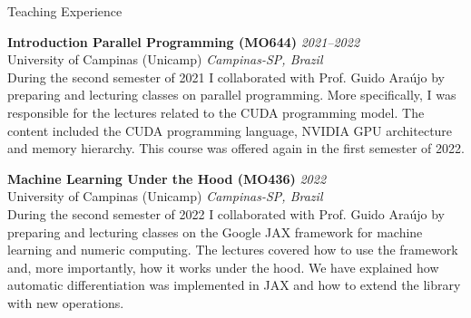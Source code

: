 \documentclass{resume}
\begin{document}
\begin{rSection}{Teaching Experience}

{\bf Introduction Parallel Programming (MO644)} \hfill {\em 2021--2022} \\
{\sc University of Campinas (Unicamp)} \hfill {\em Campinas-SP, Brazil} \\
During the second semester of 2021 I collaborated with Prof. Guido Araújo by
preparing and lecturing classes on parallel programming. More specifically, I
was responsible for the lectures related to the CUDA programming model. The
content included the CUDA programming language, NVIDIA GPU architecture and
memory hierarchy. This course was offered again in the first semester of 2022.

{\bf Machine Learning Under the Hood (MO436)} \hfill {\em 2022} \\
{\sc University of Campinas (Unicamp)} \hfill {\em Campinas-SP, Brazil} \\
During the second semester of 2022 I collaborated with Prof. Guido Araújo by
preparing and lecturing classes on the Google JAX framework for machine learning
and numeric computing. The lectures covered how to use the framework and, more
importantly, how it works under the hood. We have explained how automatic
differentiation was implemented in JAX and how to extend the library with new
operations.

\end{rSection}

\end{document}
